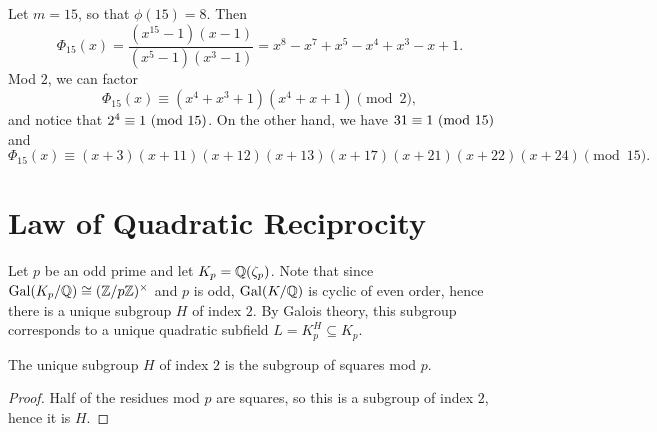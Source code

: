 \begin{example}
  Let $m = 15$, so that $\phi(15) = 8$. Then
  \[
    \Phi_{15}(x)
    = \frac{(x^{15} - 1)(x - 1)}{(x^5 - 1)(x^3 - 1)}
    = x^8 - x^7 + x^5 - x^4 + x^3 - x + 1.
  \]
  Mod $2$, we can factor
  \[
    \Phi_{15}(x) \equiv (x^4 + x^3 + 1)(x^4 + x + 1) \pmod{2},
  \]
  and notice that $2^4 \equiv 1 \ (\mathrm{mod}\ 15)$. On the
  other hand, we have $31 \equiv 1 \ (\mathrm{mod}\ 15)$ and
  \[
    \Phi_{15}(x)
    \equiv (x + 3)(x + 11)(x + 12)(x + 13)(x + 17)(x + 21)(x + 22)(x + 24)
    \pmod{15}.
  \]
\end{example}

\section{Law of Quadratic Reciprocity}
\begin{remark}
  Let $p$ be an odd prime and let
  $K_p = \mathbb{Q}(\zeta_p)$. Note that since
  $\operatorname{Gal}(K_p / \mathbb{Q}) \cong (\mathbb{Z} / p\mathbb{Z})^\times$ and $p$ is
  odd, $\operatorname{Gal}(K / \mathbb{Q})$ is cyclic of even order, hence
  there is a unique subgroup $H$ of index $2$. By Galois
  theory, this subgroup corresponds to a unique
  quadratic subfield $L = K_p^H \subseteq K_p$.
\end{remark}

\begin{lemma}
  The unique subgroup $H$ of index $2$ is the subgroup of
  squares mod $p$.
\end{lemma}

\begin{proof}
  Half of the residues mod $p$ are squares, so
  this is a subgroup of index $2$, hence it is $H$.
\end{proof}

